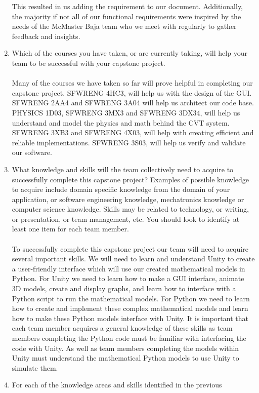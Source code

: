 \documentclass[12pt]{article}
\begin{document}
\begin{enumerate}
  This resulted  in us adding the requirement to our document.
  Additionally, the majority if not all of our functional requirements were inspired by the needs of the McMaster Baja team who we meet with regularly to gather feedback and insights.
  \item Which of the courses you have taken, or are currently taking, will help
  your team to be successful with your capstone project.
  \\\\
  Many of the courses we have taken so far will prove helpful in completing our capstone project.
  SFWRENG 4HC3, will help us with the design of the GUI.
  SFWRENG 2AA4 and SFWRENG 3A04 will help us architect our code base.
  PHYSICS 1D03, SFWRENG 3MX3 and SFWRENG 3DX34, will help us understand and model the physics and math behind the CVT system.
  SFWRENG 3XB3 and SFWRENG 4X03, will help with creating efficient and reliable implementations.
  SFWRENG 3S03, will help us verify and validate our software.
  \item What knowledge and skills will the team collectively need to acquire to
  successfully complete this capstone project?  Examples of possible knowledge
  to acquire include domain specific knowledge from the domain of your
  application, or software engineering knowledge, mechatronics knowledge or
  computer science knowledge.  Skills may be related to technology, or writing,
  or presentation, or team management, etc.  You should look to identify at
  least one item for each team member.
  \\\\
  To successfully complete this capstone project our team will need to acquire several important skills.
  We will need to learn and understand Unity to create a user-friendly interface which will use our created mathematical models in Python.
  For Unity we need to learn how to make a GUI interface, animate 3D models, create and display graphs, and learn how to interface with a Python script to run the mathematical models.
  For Python we need to learn how to create and implement these complex mathematical models and learn how to make these Python models interface with Unity.
  It is important that each team member acquires a general knowledge of these skills as team members completing the Python code must be familiar with interfacing the code with Unity. 
  As well as team members completing the models within Unity must understand the mathematical Python models to use Unity to simulate them. 
  \item For each of the knowledge areas and skills identified in the previous

\end{enumerate}
\end{document}
